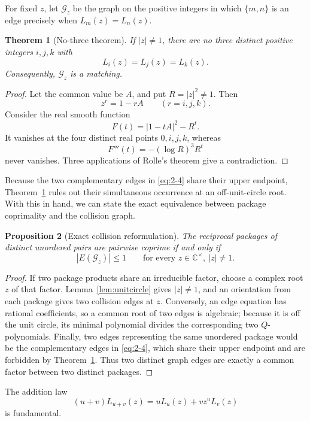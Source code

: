 \documentclass[11pt]{article}
\numberwithin{equation}{section}
\newtheorem{theorem}{Theorem}[section]
\newtheorem{proposition}[theorem]{Proposition}
\theoremstyle{definition}
\newcommand{\C}{\mathbb C}
\begin{document}
For fixed \(z\), let \(\mathcal G_z\) be the graph on the positive integers in
which \(\{m,n\}\) is an edge precisely when \(L_m(z)=L_n(z)\).

\begin{theorem}[No-three theorem]\label{thm:nothree}
If \(|z|\neq1\), there are no three distinct positive integers \(i,j,k\) with
\[
 L_i(z)=L_j(z)=L_k(z).
\]
Consequently, \(\mathcal G_z\) is a matching.
\end{theorem}

\begin{proof}
Let the common value be \(A\), and put \(R=|z|^2\neq1\).  Then
\[
 z^r=1-rA\qquad(r=i,j,k).
\]
Consider the real smooth function
\[
 F(t)=|1-tA|^2-R^t.
\]
It vanishes at the four distinct real points \(0,i,j,k\), whereas
\[
 F'''(t)=-(\log R)^3R^t
\]
never vanishes.  Three applications of Rolle's theorem give a contradiction.
\end{proof}

Because the two complementary edges in \eqref{eq:2-4} share their upper endpoint,
Theorem~\ref{thm:nothree} rules out their simultaneous occurrence at an
off-unit-circle root.  With this in hand, we can state the exact equivalence
between package coprimality and the collision graph.

\begin{proposition}[Exact collision reformulation]\label{prop:equivalence}
The reciprocal packages of distinct unordered pairs are pairwise coprime if
and only if
\[
 |E(\mathcal G_z)|\leq1
 \qquad\text{for every }z\in\C^\times,\ \lvert z\rvert\neq1.
 \label{eq:3-1}
\]
\end{proposition}

\begin{proof}
If two package products share an irreducible factor, choose a complex root
\(z\) of that factor.  Lemma~\ref{lem:unitcircle} gives \(|z|\neq1\), and
an orientation from each package gives two collision edges at \(z\).
Conversely, an edge equation has rational coefficients, so a common root of
two edges is algebraic; because it is off the unit circle, its minimal
polynomial divides the corresponding two \(Q\)-polynomials.  Finally, two
edges representing the same unordered package would be the complementary
edges in \eqref{eq:2-4}, which share their upper endpoint and are forbidden by
Theorem~\ref{thm:nothree}.  Thus two distinct graph edges are exactly a common
factor between two distinct packages.
\end{proof}

The addition law
\begin{equation}
 (u+v)L_{u+v}(z)=uL_u(z)+vz^uL_v(z)
 \label{eq:3-2}
\end{equation}
is fundamental.
\end{document}
